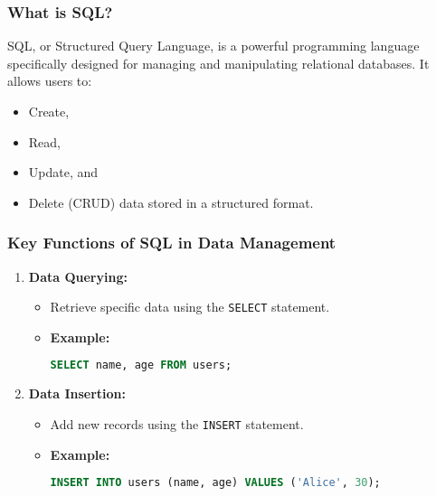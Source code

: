 \documentclass{beamer}
\begin{document}
\begin{frame}[fragile]
    \frametitle{What is SQL?}
    SQL, or Structured Query Language, is a powerful programming language specifically designed for managing and manipulating relational databases. It allows users to:
    \begin{itemize}
        \item Create, 
        \item Read, 
        \item Update, and 
        \item Delete (CRUD) data stored in a structured format.
    \end{itemize}
\end{frame}

\begin{frame}[fragile]
    \frametitle{Key Functions of SQL in Data Management}
    \begin{enumerate}
        \item \textbf{Data Querying:}
        \begin{itemize}
            \item Retrieve specific data using the \texttt{SELECT} statement.
            \item \textbf{Example:}
            \begin{lstlisting}[language=SQL]
SELECT name, age FROM users;
            \end{lstlisting}
        \end{itemize}

        \item \textbf{Data Insertion:}
        \begin{itemize}
            \item Add new records using the \texttt{INSERT} statement.
            \item \textbf{Example:}
            \begin{lstlisting}[language=SQL]
INSERT INTO users (name, age) VALUES ('Alice', 30);
            \end{lstlisting}
        \end{itemize}
    \end{enumerate}
\end{frame}
\end{document}
